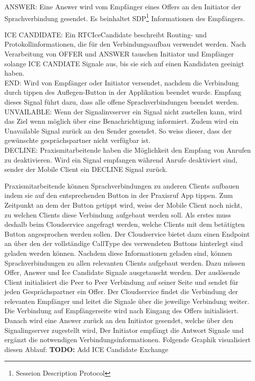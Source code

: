 ANSWER: Eine Answer wird vom Empfänger eines Offers an den Initiator der Sprachverbindung gesendet.
Es beinhaltet SDP\footnote{Sesseion Description Protocol} Informationen des Empfängers.

ICE CANDIDATE: Ein RTCIceCandidate beschreibt Routing- und Protokollinformationen, die für den Verbindungsaufbau verwendet werden.
Nach Verarbeitung von OFFER und ANSWER tauschen Initiator und Empfänger solange ICE CANDIATE Signale aus, bis sie sich auf einen Kandidaten geeinigt haben.\\

END: Wird von Empfänger oder Initiator versendet, nachdem die Verbindung durch tippen des Auflegen-Button in der Applikation beendet wurde.
Empfang dieses Signal führt dazu, dass alle offene Sprachverbindungen beendet werden.\\

UNVAILABLE: Wenn der Signalinvserver ein Signal nicht zustellen kann, wird das Ziel wenn möglich über eine Benachrichtigung informiert.
Zudem wird ein Unavailable Signal zurück an den Sender gesendet.
So weiss dieser, dass der gewünschte gesprächspartner nicht verfügbar ist. \\

DECLINE: Praxismitarbeitende haben die Möglichkeit den Empfang von Anrufen zu deaktivieren.
Wird ein Signal empfangen während Anrufe deaktiviert sind, sender der Mobile Client ein DECLINE Signal zurück. \\

\clearpage

Praxismitarbeitende können Sprachverbindungen zu anderen Clients aufbauen indem sie auf den entsprechenden Button in der Praxisruf App tippen.
Zum Zeitpunkt an dem der Button getippt wird, weiss der Mobile Client noch nicht, zu welchen Clients diese Verbindung aufgebaut werden soll.
Als erstes muss deshalb beim Cloudservice angefragt werden, welche Clients mit dem betätigten Button angesprochen werden sollen.
Der Cloudservice bietet dazu einen Endpoint an über den der vollständige CallType des verwendeten Buttons hinterlegt sind geladen werden können.
Nachdem diese Informationen geladen sind, können Sprachverbindungen zu allen relevanten Clients aufgebaut werden.
Dazu müssen Offer, Answer und Ice Candidate Signale ausgetauscht werden.
Der auslösende Client initialisiert die Peer to Peer Verbindung auf seiner Seite und sendet für jeden Gesprächspartner ein Offer.
Der Cloudservice findet die Verbindung der relevanten Empfänger und leitet die Signale über die jeweilige Verbindung weiter.
Die Verbindung auf Empfängerseite wird nach Eingang des Offers initialisiert.
Danach wird eine Answer zurück an den Initiator gesendet, welche über den Signalingserver zugestellt wird,
Der Initiator empfängt die Antwort Signale und ergänzt die notwendigen Verbindungsinformationen.
Folgende Graphik visualisiert diesen Ablauf:
\textbf{TODO: } Add ICE Candidate Exchange

